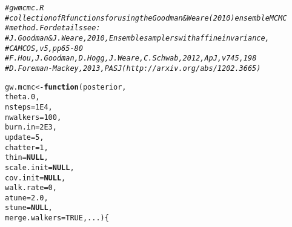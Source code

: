 \documentclass{article}\usepackage[]{graphicx}\usepackage[]{color}
\makeatletter
\newcommand{\hlnum}[1]{\textcolor[rgb]{0.686,0.059,0.569}{#1}}%
\newcommand{\hlcom}[1]{\textcolor[rgb]{0.678,0.584,0.686}{\textit{#1}}}%
\newcommand{\hlstd}[1]{\textcolor[rgb]{0.345,0.345,0.345}{#1}}%
\newcommand{\hlkwa}[1]{\textcolor[rgb]{0.161,0.373,0.58}{\textbf{#1}}}%
\newcommand{\hlkwb}[1]{\textcolor[rgb]{0.69,0.353,0.396}{#1}}%
\newcommand{\hlkwc}[1]{\textcolor[rgb]{0.333,0.667,0.333}{#1}}%
\newenvironment{kframe}{%
 \def\at@end@of@kframe{}%
 \ifinner\ifhmode%
  \def\at@end@of@kframe{\end{minipage}}%
  \begin{minipage}{\columnwidth}%
 \fi\fi%
 \def\FrameCommand##1{\hskip\@totalleftmargin \hskip-\fboxsep
 \colorbox{shadecolor}{##1}\hskip-\fboxsep
     \hskip-\linewidth \hskip-\@totalleftmargin \hskip\columnwidth}%
 \MakeFramed {\advance\hsize-\width
   \@totalleftmargin\z@ \linewidth\hsize
   \@setminipage}}%
 {\par\unskip\endMakeFramed%
 \at@end@of@kframe}
\newenvironment{knitrout}{}{} %
\makeatother
\begin{document}
\begin{knitrout}
\color{fgcolor}\begin{kframe}
\begin{alltt}
\hlcom{# gwmcmc.R}
\hlcom{# collection of R functions for using the Goodman & Weare (2010) ensemble MCMC}
\hlcom{# method. For details see: }
\hlcom{# J. Goodman & J. Weare, 2010, Ensemble samplers with affine invariance, }
\hlcom{#           CAMCOS, v5, pp65-80 }
\hlcom{# F. Hou, J. Goodman, D. Hogg, J. Weare, C. Schwab, 2012, ApJ, v745, 198 }
\hlcom{# D. Foreman-Mackey, 2013, PASJ (http://arxiv.org/abs/1202.3665)}
\end{alltt}
\end{kframe}
\end{knitrout}
\begin{knitrout}
\color{fgcolor}\begin{kframe}
\begin{alltt}
\hlstd{gw.mcmc} \hlkwb{<-} \hlkwa{function}\hlstd{(}\hlkwc{posterior}\hlstd{,}
                    \hlkwc{theta.0}\hlstd{,}
                    \hlkwc{nsteps} \hlstd{=} \hlnum{1E4}\hlstd{,}
                    \hlkwc{nwalkers} \hlstd{=} \hlnum{100}\hlstd{,}
                    \hlkwc{burn.in} \hlstd{=} \hlnum{2E3}\hlstd{,}
                    \hlkwc{update} \hlstd{=} \hlnum{5}\hlstd{,}
                    \hlkwc{chatter} \hlstd{=} \hlnum{1}\hlstd{,}
                    \hlkwc{thin} \hlstd{=} \hlkwa{NULL}\hlstd{,}
                    \hlkwc{scale.init} \hlstd{=} \hlkwa{NULL}\hlstd{,}
                    \hlkwc{cov.init} \hlstd{=} \hlkwa{NULL}\hlstd{,}
                    \hlkwc{walk.rate} \hlstd{=} \hlnum{0}\hlstd{,}
                    \hlkwc{atune} \hlstd{=} \hlnum{2.0}\hlstd{,}
                    \hlkwc{stune} \hlstd{=} \hlkwa{NULL}\hlstd{,}
                    \hlkwc{merge.walkers} \hlstd{=} \hlnum{TRUE}\hlstd{,} \hlkwc{...}\hlstd{) \{}


\end{alltt}
\end{kframe}
\end{knitrout}
\end{document}
